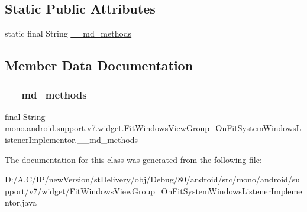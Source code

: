 \subsection*{Static Public Attributes}
\begin{DoxyCompactItemize}
\item 
static final String \hyperlink{classmono_1_1android_1_1support_1_1v7_1_1widget_1_1_fit_windows_view_group___on_fit_system_windows_listener_implementor_a4bfebff3c5afa405dc21820881b44472}{\+\_\+\+\_\+md\+\_\+methods}
\end{DoxyCompactItemize}


\subsection{Member Data Documentation}
\mbox{\label{classmono_1_1android_1_1support_1_1v7_1_1widget_1_1_fit_windows_view_group___on_fit_system_windows_listener_implementor_a4bfebff3c5afa405dc21820881b44472}} 
\subsubsection{\texorpdfstring{\+\_\+\+\_\+md\+\_\+methods}{\_\_md\_methods}}
{\footnotesize\ttfamily final String mono.\+android.\+support.\+v7.\+widget.\+Fit\+Windows\+View\+Group\+\_\+\+On\+Fit\+System\+Windows\+Listener\+Implementor.\+\_\+\+\_\+md\+\_\+methods\hspace{0.3cm}{\ttfamily [static]}}



The documentation for this class was generated from the following file\+:\begin{DoxyCompactItemize}
\item 
D\+:/\+A.\+C/\+I\+P/new\+Version/st\+Delivery/obj/\+Debug/80/android/src/mono/android/support/v7/widget/Fit\+Windows\+View\+Group\+\_\+\+On\+Fit\+System\+Windows\+Listener\+Implementor.\+java\end{DoxyCompactItemize}

